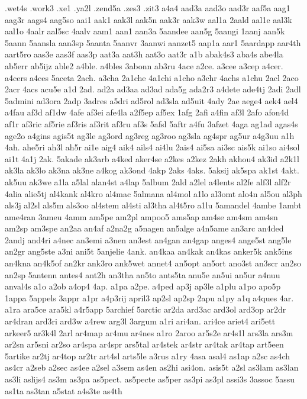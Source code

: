 {.wet4s
.work3
.xe1
.ya2l
.zend5a
.zes3
.zit3
a4a4
aad3a
aad3o
aad3r
aaf5a
aag1
aag3r
aags4
aag5so
aai1
aak1
aak3l
aak5n
aak3r
aak3w
aal1a
2aald
aal1e
aal3k
aal1o
4aalr
aal5sc
4aalv
aam1
aan1
aan3a
5aandee
aan5g
5aangi
1aanj
aan5k
5aann
5aansla
aan3sp
5aanta
5aanvr
3aanwi
aanzet5
aap1a
aar1
5aardapp
aar4th
aart5ro
aas3e
aas3f
aas3p
aat3a
aat3h
aat3o
aat3r
a1b
abak4s3
aba4s
abe4la
ab5err
ab5ijz
able2
a4ble.
a4bles
3abonn
ab3ru
4ace
a2ce.
a3cee
a3cep
a4cer.
a4cers
a4ces
5aceta
2ach.
a3cha
2a1che
4a1chi
a1cho
a3chr
4achs
a1chu
2acl
2aco
2acr
4acs
acu5e
a1d
2ad.
ad2a
ad3aa
ad3ad
ada5g
ada2r3
a4dete
ade4tj
2adi
2adl
5admini
ad3ora
2adp
3adres
a5dri
ad5rol
ad3sla
ad5uit
4ady
2ae
aege4
aek4
ael4
a4fau
af3d
af1dw
4afe
af3ei
afe4la
a2f5ep
af5ex
1afg
2afi
a4fin
af3l
2afo
afon4d
af1r
af3ric
af5rie
af3ris
af3rit
af3ru
af3s
5afsl
5aftr
a4fu
3afzet
4aga
ag1ad
agas4s
age2o
a4gins
agis5t
ag3le
ag3ord
ag3reg
ag3roo
ag3sla
ag4spr
ag5ur
a4g3uu
a1h
4ah.
ahe5ri
ah3l
ah5r
ai1e
aig4
aik4
ails4
ai4lu
2ais4
ai5sa
ai3sc
ais5k
ai1so
ai4sol
ai1t
4a1j
2ak.
5akade
ak3arb
a4ked
aker4se
a2kes
a2kez
2akh
akhou4
ak3id
a2k1l
ak3la
ak3lo
ak3na
ak3ne
a4kog
ak3ond
4akp
2aks
4aks.
5aksij
ak5spa
ak1st
4akt.
ak5uu
ak3we
a1la
a5lal
alan4st
a4lap
5album
2ald
a2lel
a4lents
al2fe
alf3l
alf2r
4alia
alie5tj
al4kank
al4kro
al4mac
5almana
al4mol
a1lo
al3omt
alo4n
al5ou
al3ph
als3j
al2sl
als5m
als3oo
al4stem
al4sti
al3tha
al4t5ro
a1lu
5amandel
4ambe
1ambt
ame4ran
3ameu
4amm
am5pe
am2pl
ampoo5
ams5ap
am4se
am4sm
am4sn
am2sp
am3spe
an2aa
an4af
a2na2g
a5nagen
an5alge
a4n5ame
an3arc
an4ded
2andj
and4ri
a4nec
an3emi
a3nen
an3est
an4gan
an4gap
anges4
ange5st
ang5le
an2gr
ang5ste
a3ni
ani5t
5anjelie
4ank.
an4kaa
an4kak
an4kas
anker5k
ank5ins
an4kna
an4k5of
an2kr
ank3ro
ank5wet
annet4
an5opt
an5ort
ano3st
an3scr
an2so
an2sp
5antenn
antes4
ant2h
an3tha
an5to
ants5ta
anu5e
an5ui
an5ur
a4nuu
anval4s
a1o
a2ob
a4op4
4ap.
a1pa
a2pe.
a4ped
ap3j
ap3le
a1plu
a1po
apo5p
1appa
5appels
3appr
a1pr
a4p3rij
april3
ap2sl
ap2sp
2apu
a1py
a1q
a4ques
4ar.
a1ra
ara5ce
ara5kl
a4r5app
5archief
5arctic
ar2da
ard3ac
ard3ol
ard3op
ar2dr
ar4dran
ard3ri
ard3w
a4rew
arg3l
3argum
a1ri
ari4an.
ari4ce
ariet4
ari5ett
arkeer5
ar3k4l
2arl
ar4map
ar4mu
ar4nes
a1ro
2aroo
ar5s2e
ar4s1l
ars3la
ars3m
ar2sn
ar5sni
ar2so
ar4spa
ar4spr
ars5tal
ar4stek
ar4str
ar4tak
ar4tap
art5een
5artike
ar2tj
ar4top
ar2tr
art4sl
arts5le
a3rus
a1ry
4asa
asal4
as1ap
a2sc
as4ch
as4cr
a2seb
a2sec
as4ee
a2sel
a3sem
as4en
as2hi
asi4on.
asis5t
a2sl
as3lam
as3lan
as3li
aslijs4
as3m
as3pa
as5pect.
as5pecte
as5per
as3pi
as3pl
assi3s
3assoc
5assu
as1ta
as3tan
a5stat
a4s3te
as4th
}
